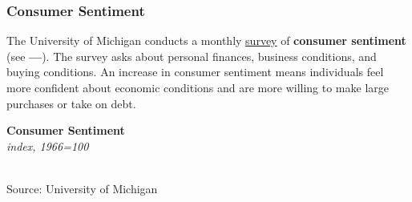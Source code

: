 \documentclass{report}
\makeatletter
\newcommand{\tbllink}[1]{\href{https://raw.githubusercontent.com/bdecon/US-chartbook/master/chartbook/data/#1}{\faTable}}
\newcommand*\short[1]{\expandafter\@gobbletwo\number\numexpr#1\relax}
\newcommand{\dateaxisticks}{
		date coordinates in=x, axis line style={draw=none},
		xmax={2022-03-15},
		max space between ticks=40,	    
		xtick={{1990-01-01}, {1992-01-01}, {1994-01-01}, 
			{1996-01-01}, {1998-01-01}, {2000-01-01}, 
			{2002-01-01}, {2004-01-01}, {2006-01-01},
			{2008-01-01}, {2010-01-01}, {2012-01-01}, {2014-01-01},
		    {2016-01-01}, {2018-01-01}, {2020-01-01}, {2022-01-01}, 
		    {2024-01-01}, {2026-01-01}},
		minor xtick={{1989-01-01}, {1991-01-01}, {1993-01-01},
			{1995-01-01}, {1997-01-01}, {1999-01-01}, 
			{2001-01-01}, {2003-01-01}, {2005-01-01}, {2007-01-01},
		    {2009-01-01}, {2011-01-01}, {2013-01-01}, {2015-01-01},
		    {2017-01-01}, {2019-01-01}, {2021-01-01}, {2023-01-01}, 
		    {2025-01-01}, {2027-01-01}},
		enlarge y limits={0.06}, enlarge x limits={0.01},
		}
\newcommand{\bbar}[2]{extra #1 ticks = {{#2}}, extra #1 tick labels = ,
		extra #1 tick style = {grid=major, grid style={thick, black!25}},}
\newcommand{\stdline}[4]{\addplot[very thick, no markers, color=#1] 
		table [x=#2, y=#3, col sep=comma] {#4};	}
\newcommand{\rbars}{
		\fill[color=black!10] (axis cs:{1990-07-01},\pgfkeysvalueof{/pgfplots/ymin}) rectangle 
			(axis cs:{1991-03-01}, \pgfkeysvalueof{/pgfplots/ymax});
		\fill[color=black!10] (axis cs:{2007-12-01},\pgfkeysvalueof{/pgfplots/ymin}) rectangle 
			(axis cs:{2009-07-01}, \pgfkeysvalueof{/pgfplots/ymax});
		\fill[color=black!10] (axis cs:{2001-03-01},\pgfkeysvalueof{/pgfplots/ymin}) rectangle 
			(axis cs:{2001-11-01}, \pgfkeysvalueof{/pgfplots/ymax});
		\fill[color=black!10] (axis cs:{2020-02-01},\pgfkeysvalueof{/pgfplots/ymin}) rectangle 
			(axis cs:{2020-05-01}, \pgfkeysvalueof{/pgfplots/ymax});}
\makeatother
\begin{document}
{\begin{minipage}{0.76\textwidth}
\subsubsection*{Consumer Sentiment}
\small The University of Michigan conducts a monthly \href{http://www.sca.isr.umich.edu/}{survey} of \textbf{consumer sentiment} (see {\color{violet!60!blue}\textbf{---}}). The survey asks about personal finances, business conditions, and buying conditions. An increase in consumer sentiment means individuals feel more confident about economic conditions and are more willing to make large purchases or take on debt. 



\normalsize \textbf{Consumer Sentiment}\\
\footnotesize{\textit{index, 1966=100}}\\
\hspace*{-2mm} \\
\footnotesize{Source: University of Michigan} \hfill \tbllink{umichsoc.csv}
\vspace{2.5mm}

\small 


\end{minipage}}
\end{document}
